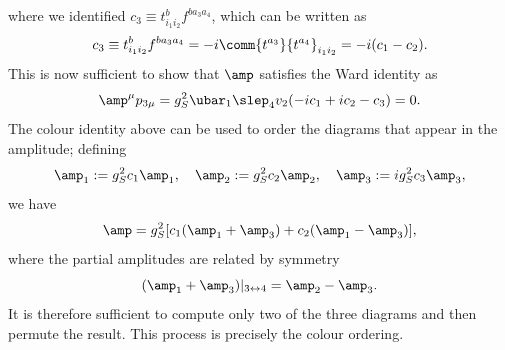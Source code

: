 where we identified $c_3 \equiv t^b_{i_1i_2}f^{ba_3a_4}$, which can be written as
\begin{equation}
    c_3 \equiv t^b_{i_1i_2}f^{ba_3a_4} = -i\comm{t^{a_3}}{t^{a_4}}_{i_1i_2} = -i(c_1 - c_2).
\end{equation}
This is now sufficient to show that $\amp$ satisfies the Ward identity as
\begin{equation}
    \amp^\mu p_{3\mu} = g_S^2\ubar_1\slep_4v_2(-ic_1 + ic_2 - c_3) = 0.
\end{equation}
The colour identity above can be used to order the diagrams that appear in the amplitude; defining
\begin{equation}
    \amp_1 := g_S^2c_1\amp_1,\quad \amp_2 := g_S^2c_2\amp_2,\quad \amp_3 := ig_S^2c_3\amp_3,
\end{equation}
we have
\begin{equation}
    \amp = g_S^2[c_1(\amp_1 + \amp_3) + c_2(\amp_1 - \amp_3)],
\end{equation}
where the partial amplitudes are related by symmetry 
\begin{equation}
    (\amp_1 + \amp_3)|_{3\leftrightarrow 4} = \amp_2 - \amp_3.
\end{equation}
It is therefore sufficient to compute only two of the three diagrams and then permute the result. This process is precisely the colour ordering. 

